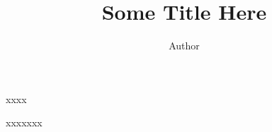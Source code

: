 


\title{Some Title Here}
\author{Author}









\begin{abstract}
	\myabstract
	\abstractsignature
\end{abstract}

\begin{frontmatter}
\maketitle


\begin{dedication}
\null\vfil
{\large
\begin{center}
xxxx
\end{center}}
\vfil\null
\end{dedication}

\begin{acknowledgments}
xxxxxxx
\end{acknowledgments}

\tableofcontents
\listoffigures
\listoftables

    \newpage
    \begin{inlineabstract}
		\begin{small}
		\myabstract
		\end{small}
		
    \end{inlineabstract}

\end{frontmatter}
